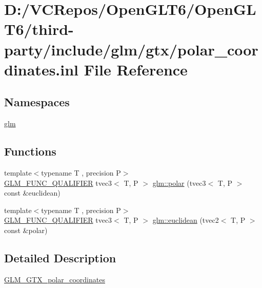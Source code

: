 \hypertarget{polar__coordinates_8inl}{}\section{D\+:/\+V\+C\+Repos/\+Open\+G\+L\+T6/\+Open\+G\+L\+T6/third-\/party/include/glm/gtx/polar\+\_\+coordinates.inl File Reference}
\label{polar__coordinates_8inl}
\subsection*{Namespaces}
\begin{DoxyCompactItemize}
\item 
 \mbox{\hyperlink{namespaceglm}{glm}}
\end{DoxyCompactItemize}
\subsection*{Functions}
\begin{DoxyCompactItemize}
\item 
{\footnotesize template$<$typename T , precision P$>$ }\\\mbox{\hyperlink{setup_8hpp_a33fdea6f91c5f834105f7415e2a64407}{G\+L\+M\+\_\+\+F\+U\+N\+C\+\_\+\+Q\+U\+A\+L\+I\+F\+I\+ER}} tvec3$<$ T, P $>$ \mbox{\hyperlink{group__gtx__polar__coordinates_gafcf95a38c780a4ad5ba14c8ac9e522bb}{glm\+::polar}} (tvec3$<$ T, P $>$ const \&euclidean)
\item 
{\footnotesize template$<$typename T , precision P$>$ }\\\mbox{\hyperlink{setup_8hpp_a33fdea6f91c5f834105f7415e2a64407}{G\+L\+M\+\_\+\+F\+U\+N\+C\+\_\+\+Q\+U\+A\+L\+I\+F\+I\+ER}} tvec3$<$ T, P $>$ \mbox{\hyperlink{group__gtx__polar__coordinates_ga45ece1fbf7260c43e0f873c498202581}{glm\+::euclidean}} (tvec2$<$ T, P $>$ const \&polar)
\end{DoxyCompactItemize}


\subsection{Detailed Description}
\mbox{\hyperlink{group__gtx__polar__coordinates}{G\+L\+M\+\_\+\+G\+T\+X\+\_\+polar\+\_\+coordinates}} 